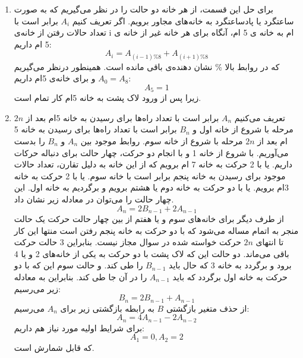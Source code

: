 \p
\begin{enumerate}
    \item
    برای حل این قسمت، از هر خانه دو حالت را در نظر می‌گیریم که به صورت ساعتگرد یا پادساعتگرد به خانه‌های مجاور برویم. اگر تعریف کنیم \(A_i\) برابر است با تعداد حالات رفتن از خانه‌ی i ام به خانه ی 5 ام، آنگاه برای هر خانه غیر از خانه ی 5 ام داریم:
    \[ A_i=A_{(i-1)\%8} + A_{(i+1)\%8}\]که در روابط بالا \% نشان دهنده‌ی باقی مانده است. همینطور درنظر می‌گیریم \(A_0=A_8\) و برای خانه‌ی 5ام داریم:
    \[A_5 = 1\]زیرا پس از ورود لاک پشت به خانه 5ام کار تمام است.
    
    \item
    \p
      تعریف می‌کنیم \(A_n\) برابر است با تعداد راه‌ها برای رسیدن به خانه 5ام بعد از 
      $2n $
      مرحله با شروع از خانه اول و \(B_n\) برابر است با تعداد راه‌ها برای رسیدن به خانه 5 ام بعد از 
      $2n$
       مرحله با شروع از خانه سوم. روابط موجود بین \(A_n\) و \(B_n\) را بدست می‌آوریم. با شروع از خانه 1 و با انجام دو حرکت، چهار حالت برای دنباله حرکات داریم. یا با 2 حرکت به خانه 7 ام برویم که از این خانه به دلیل تقارن، تعداد حالات موجود برای رسیدن به خانه پنجم برابر است با خانه سوم. یا با 2 حرکت به خانه 3ام برویم. یا با دو حرکت به خانه دوم یا هشتم برویم و برگردیم به خانه اول. این چهار حالت را می‌توان در معادله زیر نشان داد.
\[ A_n=2B_{n-1}+2A_{n-1} \]از طرف دیگر برای خانه‌های سوم و یا هفتم از بین چهار حالت حرکت یک حالت منجر به اتمام مساله می‌شود که با دو حرکت به خانه پنجم رفتن است منتها این کار تا انتهای
$2n$
 حرکت خواسته شده در سوال مجاز نیست. بنابراین 3 حالت حرکت باقی می‌ماند. دو حالت این که لاک پشت با دو حرکت به یکی از خانه‌های 2 و یا 4 برود و برگردد به خانه 3 که حال باید \(B_{n-1}\) را طی کند. و حالت سوم این که با دو حرکت به خانه اول برگردد که باید \(A_{n-1}\) را در آن جا طی کند. بنابراین به معادله زیر می‌رسیم:
\[ B_n = 2 B_{n-1}+A_{n-1} \]از حذف متغیر بازگشتی 
$B$
به رابطه بازگشتی زیر برای \(A_n\) می‌رسیم:
\[ A_n=4A_{n-1} - 2A_{n-2} \]
برای شرایط اولیه مورد نیاز هم داریم:
\[ A_1 = 0, A_2 = 2 \]که قابل شمارش است.
\end{enumerate}